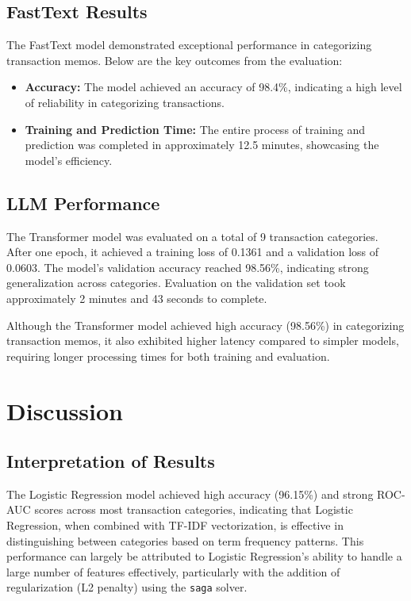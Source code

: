 \documentclass[12pt,letterpaper]{article}
\begin{document}
\subsection{FastText Results}
The FastText model demonstrated exceptional performance in categorizing transaction memos. Below are the key outcomes from the evaluation:

\begin{itemize}
    \item \textbf{Accuracy:} The model achieved an accuracy of 98.4\%, indicating a high level of reliability in categorizing transactions.
    \item \textbf{Training and Prediction Time:} The entire process of training and prediction was completed in approximately 12.5 minutes, showcasing the model's efficiency.
\end{itemize}


\subsection{LLM Performance}
The Transformer model was evaluated on a total of 9 transaction categories. After one epoch, it achieved a training loss of 0.1361 and a validation loss of 0.0603. The model’s validation accuracy reached 98.56\%, indicating strong generalization across categories. Evaluation on the validation set took approximately 2 minutes and 43 seconds to complete.

Although the Transformer model achieved high accuracy (98.56\%) in categorizing transaction memos, it also exhibited higher latency compared to simpler models, requiring longer processing times for both training and evaluation.

\section{Discussion}
\subsection{Interpretation of Results}

The Logistic Regression model achieved high accuracy (96.15\%) and strong ROC-AUC scores across most transaction categories, indicating that Logistic Regression, when combined with TF-IDF vectorization, is effective in distinguishing between categories based on term frequency patterns. This performance can largely be attributed to Logistic Regression's ability to handle a large number of features effectively, particularly with the addition of regularization (L2 penalty) using the \texttt{saga} solver.
\end{document}

